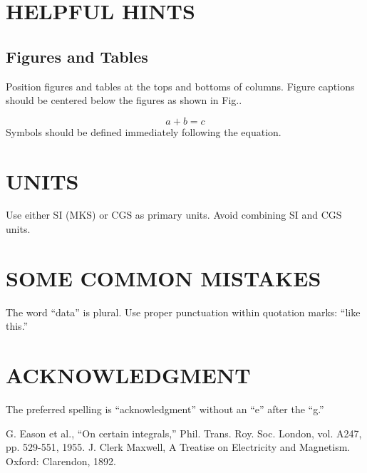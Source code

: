 \documentclass[conference]{IEEEtran}
\begin{document}
\section{HELPFUL HINTS}
\subsection{Figures and Tables}
Position figures and tables at the tops and bottoms of columns. Figure captions should be centered below the figures as shown in Fig..

\begin{equation}
a + b = c
\end{equation}
Symbols should be defined immediately following the equation.

\section{UNITS}
Use either SI (MKS) or CGS as primary units. Avoid combining SI and CGS units.

\section{SOME COMMON MISTAKES}
The word ``data'' is plural. Use proper punctuation within quotation marks: ``like this.'' 

\section*{ACKNOWLEDGMENT}
The preferred spelling is ``acknowledgment'' without an ``e'' after the ``g.''

\balance %

\begin{thebibliography}{9}
 G. Eason et al., ``On certain integrals,'' Phil. Trans. Roy. Soc. London, vol. A247, pp. 529-551, 1955.
 J. Clerk Maxwell, A Treatise on Electricity and Magnetism. Oxford: Clarendon, 1892.
\end{thebibliography}
\end{document}
